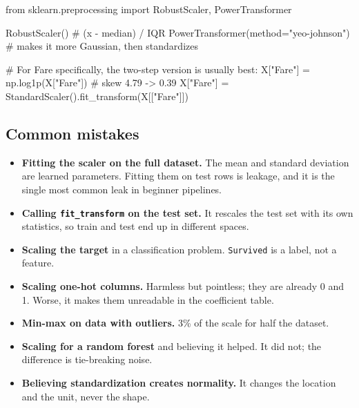 \documentclass[11pt,a4paper]{article}
\begin{document}



\begin{py}
from sklearn.preprocessing import RobustScaler, PowerTransformer

RobustScaler()                              # (x - median) / IQR
PowerTransformer(method="yeo-johnson")      # makes it more Gaussian, then standardizes

# For Fare specifically, the two-step version is usually best:
X["Fare"] = np.log1p(X["Fare"])             # skew 4.79 -> 0.39
X["Fare"] = StandardScaler().fit_transform(X[["Fare"]])
\end{py}

\subsection*{Common mistakes}

\begin{itemize}\itemsep3pt
  \item \textbf{Fitting the scaler on the full dataset.} The mean and standard deviation are
        learned parameters. Fitting them on test rows is leakage, and it is the single most
        common leak in beginner pipelines.
  \item \textbf{Calling \lstinline|fit_transform| on the test set.} It rescales the test set
        with its own statistics, so train and test end up in different spaces.
  \item \textbf{Scaling the target} in a classification problem. \texttt{Survived} is a
        label, not a feature.
  \item \textbf{Scaling one-hot columns.} Harmless but pointless; they are already 0 and 1.
        Worse, it makes them unreadable in the coefficient table.
  \item \textbf{Min-max on data with outliers.} 3\% of the scale for half the dataset.
  \item \textbf{Scaling for a random forest} and believing it helped. It did not; the
        difference is tie-breaking noise.
  \item \textbf{Believing standardization creates normality.} It changes the location and
        the unit, never the shape.
\end{itemize}
\end{document}
